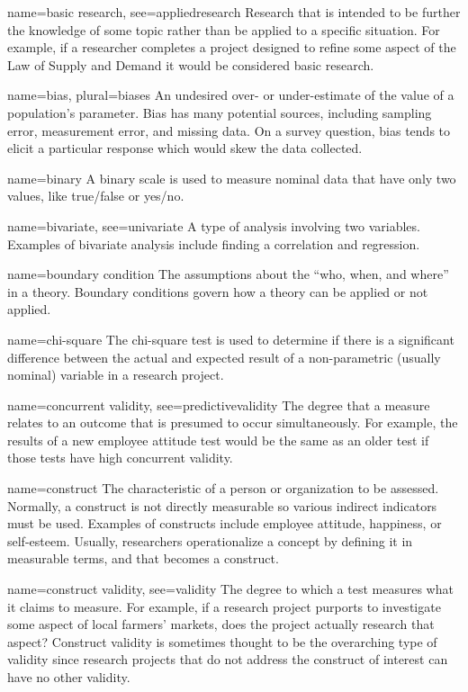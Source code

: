 {name={basic research},
	see={appliedresearch}}
{%
	Research that is intended to be further the knowledge of some topic rather than be applied to a specific situation. For example, if a researcher completes a project designed to refine some aspect of the Law of Supply and Demand it would be considered basic research.  
}

{name={bias},
 plural={biases}}
{%
	An undesired over- or under-estimate of the value of a population's parameter. Bias has many potential sources, including sampling error, measurement error, and missing data. On a survey question, bias tends to elicit a particular response which would skew the data collected.
}

{name={binary}}
{%
	A binary scale is used to measure nominal data that have only two values, like true/false or yes/no.
}

{name={bivariate},
	see={univariate}}
{%
	A type of analysis involving two variables. Examples of bivariate analysis include finding a correlation and regression.
}

{name={boundary condition}}
{%
	The assumptions about the ``who, when, and where'' in a theory. Boundary conditions govern how a theory can be applied or not applied.
}

{name={chi-square}}
{%
	The chi-square test is used to determine if there is a significant difference between the actual and expected result of a non-parametric (usually nominal) variable in a research project.
}

{name={concurrent validity},
	see={predictivevalidity}}
{%
	The degree that a measure relates to an outcome that is presumed to occur simultaneously. For example, the results of a new employee attitude test would be the same as an older test if those tests have high concurrent validity.
}

{name={construct}}
{%
	The characteristic of a person or organization to be assessed. Normally, a construct is not directly measurable so various indirect indicators must be used. Examples of constructs include employee attitude, happiness, or self-esteem. Usually, researchers operationalize a concept by defining it in measurable terms, and that becomes a construct.
}

{name={construct validity},
	see={validity}}
{%
	The degree to which a test measures what it claims to measure. For example, if a research project purports to investigate some aspect of local farmers' markets, does the project actually research that aspect? Construct validity is sometimes thought to be the overarching type of validity since research projects that do not address the construct of interest can have no other validity.
}

